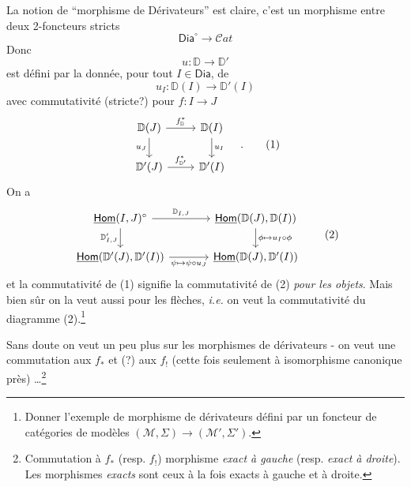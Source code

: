 \documentclass[11pt]{article}
\newcommand{\msp}[1]{\marginpar{\footnotesize [#1]}}
\newcommand{\DD}{\mathbb{D}}
\newcommand{\uHom}{\underline{\mathsf{Hom}}}
\newcommand{\Dia}{\mathsf{Dia}}
\begin{document}
\noindent\msp{page 14}La notion de “morphisme de Dérivateurs” est claire, c’est un morphisme entre deux 2-foncteurs stricts
\[
\Dia^\circ \longrightarrow \mathcal{C}at
\]
Donc
\[
u : \DD \longrightarrow \DD'
\]
est défini par la donnée, pour tout $I \in \Dia$, de
\[
u_I : \DD(I) \longrightarrow \DD'(I)
\]
avec commutativité (stricte?) pour $f : I \to J$
\[
\begin{tikzcd}
\DD(J) \arrow[r, "f^*_{\DD}"] \arrow[d, "u_J"'] & \DD(I) \arrow[d, "u_I"] \\
\DD'(J) \arrow[r, "f^*_{\DD'}"] & \DD'(I)
\end{tikzcd}
\quad . \tag*{(1)}
\]
On a
\[
\begin{tikzcd}[column sep=large]
\uHom(I,J)^\circ \arrow[r, "\DD_{I,J}"] \arrow[d, "\DD'_{I,J}"'] & \uHom(\DD(J),\DD(I)) \arrow[d, "\phi \mapsto u_I \circ \phi"] \\
\uHom(\DD'(J),\DD'(I)) \arrow[r, "\psi \mapsto \psi \circ u_J"'] & \uHom(\DD(J),\DD'(I))
\end{tikzcd}
\tag*{(2)}
\]
et la commutativité de (1) signifie la commutativité de (2) \textit{pour les objets}. Mais bien sûr on la veut aussi pour les flèches, \textit{i.e.} on veut la commutativité du diagramme (2).\footnote[5]{Donner l’exemple de morphisme de dérivateurs défini par un foncteur de catégories de modèles $(\mathcal{M},\Sigma) \to (\mathcal{M}',\Sigma')$.}

Sans doute on veut un peu plus sur les morphismes de dérivateurs - on veut une commutation aux $f_*$ et (?) aux $f_!$ (cette fois seulement à isomorphisme canonique près) \ldots\footnote[6]{Commutation à $f_*$ (resp. $f_!$) morphisme \textit{exact à gauche} (resp. \textit{exact à droite}). Les morphismes \textit{exacts} sont ceux à la fois exacts à gauche et à droite.}
\end{document}
